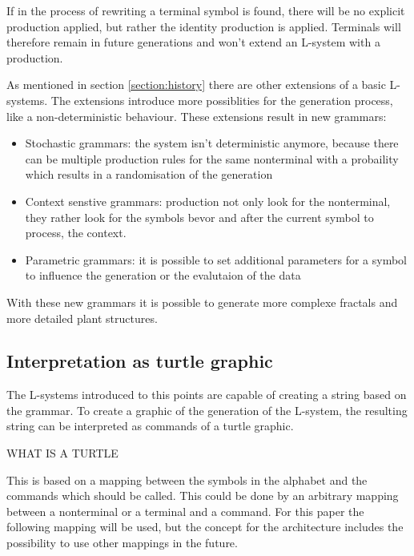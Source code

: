 \documentclass[english]{cpp-hmwk}
\begin{document}
If in the process of rewriting a terminal symbol is found, there will be no explicit production applied, but rather the identity production is applied. Terminals will therefore remain in future generations and won't extend an L-system with a production.

\bigskip

\noindent As mentioned in section \ref{section:history} there are other extensions of a basic L-systems. The extensions introduce more possiblities for the generation process, like a non-deterministic behaviour. These extensions result in new grammars:

\begin{itemize}
\item Stochastic grammars: the system isn't deterministic anymore, because there can be multiple production rules for the same nonterminal with a probaility which results in a randomisation of the generation
\item Context senstive grammars: production not only look for the nonterminal, they rather look for the symbols bevor and after the current symbol to process, the context.
\item Parametric grammars: it is possible to set additional parameters for a symbol to influence the generation or the evalutaion of the data
\end{itemize}

\noindent With these new grammars it is possible to generate more complexe fractals and more detailed plant structures.

\subsection{Interpretation as turtle graphic}
The L-systems introduced to this points are capable of creating a string based on the grammar. To create a graphic of the generation of the L-system, the resulting string can be interpreted as commands of a turtle graphic.

\bigskip

WHAT IS A TURTLE


\bigskip

This is based on a mapping between the symbols in the alphabet and the commands which should be called.
This could be done by an arbitrary mapping between a nonterminal or a terminal and a command. For this paper the following mapping will be used, but the concept for the architecture includes the possibility to use other mappings in the future.
\end{document}
